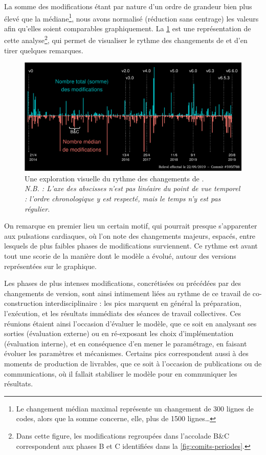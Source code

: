La somme des modifications étant par nature d'un ordre de grandeur bien plus élevé que la médiane\footnote{
	Le changement médian maximal représente un changement de 300 lignes de codes, alors que la somme concerne, elle, plus de 1500 lignes\ldots
}, nous avons normalisé (réduction sans centrage) les valeurs afin qu'elles soient comparables graphiquement.
La \cref{fig:explo-edits-code} est une représentation de cette analyse\footnote{
	Dans cette figure, les modifications regroupées dans l'accolade \og B\&C\fg{} correspondent aux phases B et C identifiées dans la \cref{fig:comits-periodes}.
}, qui permet de visualiser le \og rythme\fg{} des changements de \simfeodal{} et d'en tirer quelques remarques.


\begin{figure}[H]
	\includegraphics[width=1\linewidth]{img/explo_edits_code_clean.pdf}
	\caption[Une exploration visuelle du rythme des changements de \simfeodal{}.]{Une exploration visuelle du rythme des changements de \simfeodal{}.\\
		\textit{N.B. : L'axe des abscisses n'est pas linéaire du point de vue temporel : l'ordre chronologique y est respecté, mais le temps n'y est pas régulier.}
	}
	\label{fig:explo-edits-code}
\end{figure}

On remarque en premier lieu un certain motif, qui pourrait presque s'apparenter aux pulsations cardiaques, où l'on note des changements majeurs, espacés, entre lesquels de plus faibles phases de modifications surviennent.
Ce \og rythme\fg{} est avant tout une scorie de la manière dont le modèle a évolué, autour des versions représentées sur le graphique.

Les phases de plus intenses modifications, concrétisées ou précédées par des changements de version, sont ainsi intimement liées au rythme de ce travail de co-construction interdisciplinaire : les pics marquent en général la préparation, l'exécution, et les résultats immédiats des séances de travail collectives.
Ces réunions étaient ainsi l'occasion d'évaluer le modèle, que ce soit en analysant ses sorties (évaluation externe) ou en ré-exposant les choix d'implémentation (évaluation interne), et en conséquence d'en mener le paramétrage, en faisant évoluer les paramètres et mécanismes.
Certains pics correspondent aussi à des moments de production de \og livrables\fg{}, que ce soit à l'occasion de publications ou de communications, où il fallait stabiliser le modèle pour en communiquer les résultats.

